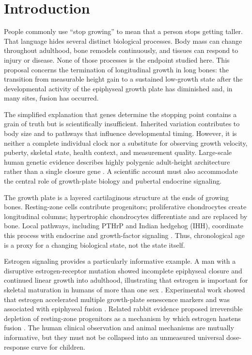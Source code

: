 \documentclass[conference]{IEEEtran}
\begin{document}
\section{Introduction}

People commonly use ``stop growing'' to mean that a person stops getting taller. That language hides several distinct biological processes. Body mass can change throughout adulthood, bone remodels continuously, and tissues can respond to injury or disease. None of those processes is the endpoint studied here. This proposal concerns the termination of longitudinal growth in long bones: the transition from measurable height gain to a sustained low-growth state after the developmental activity of the epiphyseal growth plate has diminished and, in many sites, fusion has occurred.

The simplified explanation that genes determine the stopping point contains a grain of truth but is scientifically insufficient. Inherited variation contributes to body size and to pathways that influence developmental timing. However, it is neither a complete individual clock nor a substitute for observing growth velocity, puberty, skeletal state, health context, and measurement quality. Large-scale human genetic evidence describes highly polygenic adult-height architecture rather than a single closure gene \cite{wood2014}. A scientific account must also accommodate the central role of growth-plate biology and pubertal endocrine signaling.

The growth plate is a layered cartilaginous structure at the ends of growing bones. Resting-zone cells contribute progenitors; proliferative chondrocytes create longitudinal columns; hypertrophic chondrocytes differentiate and are replaced by bone. Local pathways, including PTHrP and Indian hedgehog (IHH), coordinate this process with endocrine and growth-factor signaling \cite{vanderEerden2003,kronenberg2006}. Thus, chronological age is a proxy for a changing biological state, not the state itself.

Estrogen signaling provides a particularly informative example. A man with a disruptive estrogen-receptor mutation showed incomplete epiphyseal closure and continued linear growth into adulthood, illustrating that estrogen is important for skeletal maturation in humans of more than one sex \cite{smith1994}. Experimental work showed that estrogen accelerated multiple growth-plate senescence markers and was associated with epiphyseal fusion \cite{weise2001}. Related rabbit evidence proposed irreversible depletion of resting-zone progenitors as a mechanism by which estrogen hastens fusion \cite{nilsson2014}. The human clinical observation and animal mechanisms are mutually informative, but they must not be collapsed into an unmeasured universal dose-response curve for children.
\end{document}
